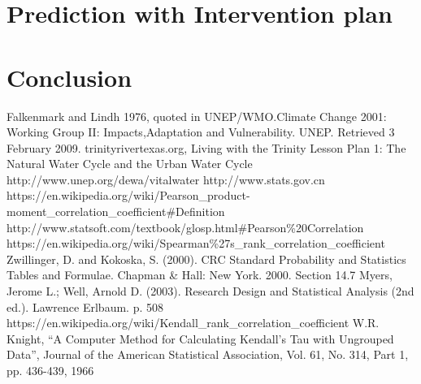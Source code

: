 \section{Prediction with Intervention plan}

\section{Conclusion}


\begin{thebibliography}{99}
   {Falkenmark and Lindh 1976, quoted in UNEP/WMO.Climate Change 2001: Working Group II: Impacts,Adaptation and Vulnerability. UNEP. Retrieved 3 February 2009.}
   trinityrivertexas.org, Living with the Trinity Lesson Plan 1: The Natural Water Cycle and the Urban Water Cycle
   http://www.unep.org/dewa/vitalwater
   http://www.stats.gov.cn
   https://en.wikipedia.org/wiki/Pearson\_product-moment\_correlation\_coefficient\#Definition
   http://www.statsoft.com/textbook/glosp.html\#Pearson\%20Correlation
   https://en.wikipedia.org/wiki/Spearman\%27s\_rank\_correlation\_coefficient
   Zwillinger, D. and Kokoska, S. (2000). CRC Standard Probability and Statistics Tables and Formulae. Chapman \& Hall: New York. 2000. Section 14.7
   Myers, Jerome L.; Well, Arnold D. (2003). Research Design and Statistical Analysis (2nd ed.). Lawrence Erlbaum. p. 508
   https://en.wikipedia.org/wiki/Kendall\_rank\_correlation\_coefficient
   W.R. Knight, “A Computer Method for Calculating Kendall’s Tau with Ungrouped Data”, Journal of the American Statistical Association, Vol. 61, No. 314, Part 1, pp. 436-439, 1966

\end{thebibliography}



